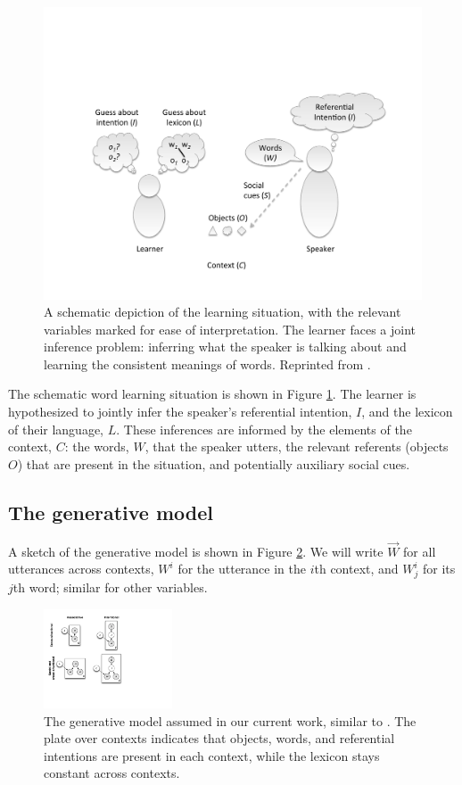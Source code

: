 \documentclass[man,noapacite,12pt]{apa2}
\begin{document}
\begin{figure}[tr]
\begin{center}
\includegraphics[width=4.5in]{figures/framework_mod.pdf}
\caption{\label{fig:setup} A schematic depiction of the learning situation, with the relevant variables marked for ease of interpretation. The learner faces a joint inference problem: inferring what the speaker is talking about and learning the consistent meanings of words. Reprinted from \protect{}.}
\end{center}
\end{figure}

The schematic word learning situation is shown in Figure \ref{fig:setup}. The learner is hypothesized to jointly infer the speaker's referential intention, $I$, and the lexicon of their language, $L$. These inferences are informed by the elements of the context, $C$: the words, $W$, that the speaker utters, the relevant referents (objects $O$) that are present in the situation, and potentially auxiliary social cues.

\subsection{The generative model}

A sketch of the generative model is shown in Figure \ref{fig:genmod}. We will write $\vec{W}$ for all utterances across contexts, $W^{i}$ for the utterance in the $i$th context, and $W^{i}_{j}$ for its $j$th word; similar for other variables.

\begin{figure}[tr]
\begin{center}
\includegraphics[width=1.5in]{figures/gen_mod.pdf}
\caption{\label{fig:genmod} The generative model assumed in our current work, similar to \protect{}. The plate over contexts indicates that objects, words, and referential intentions are present in each context, while the lexicon stays constant across contexts.}
\end{center}
\end{figure}
\end{document}
